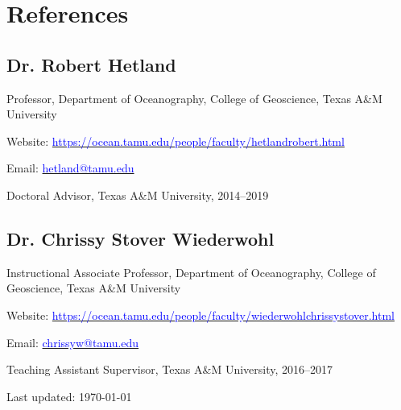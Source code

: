 \documentclass[10pt,letterpaper]{article}
\renewenvironment{itemize}{
  \begin{list}{}{
    \setlength{\leftmargin}{1.5em}
    \setlength{\itemsep}{0.25em}
    \setlength{\parskip}{0pt}
    \setlength{\parsep}{0.25em}
  }
}{
  \end{list}
}
\begin{document}
\section*{References}
\subsection*{Dr. Robert Hetland}
\begin{itemize}
    \item Professor, Department of Oceanography, College of Geoscience, Texas A\&M University
    \item Website: \href{https://ocean.tamu.edu/people/faculty/hetlandrobert.html}{\textcolor{blue}{https://ocean.tamu.edu/people/faculty/hetlandrobert.html}}
    \item Email: \href{mailto:hetland@tamu.edu}{\textcolor{blue}{hetland@tamu.edu}}
    \item Doctoral Advisor, Texas A\&M University, 2014--2019
\end{itemize}

\subsection*{Dr. Chrissy Stover Wiederwohl}
\begin{itemize}
    \item Instructional Associate Professor, Department of Oceanography, College of Geoscience, Texas A\&M University
    \item Website: \href{https://ocean.tamu.edu/people/faculty/hetlandrobert.html}{\textcolor{blue}{https://ocean.tamu.edu/people/faculty/wiederwohlchrissystover.html}}
    \item Email: \href{mailto:chrissyw@tamu.edu}{\textcolor{blue}{chrissyw@tamu.edu}}
    \item Teaching Assistant Supervisor, Texas A\&M University, 2016--2017
\end{itemize}

\bigskip

\begin{center}
  \begin{small}
    Last updated: \today
  \end{small}
\end{center}
\end{document}
